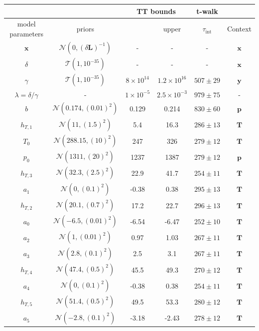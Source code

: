 \begin{table}
	\centering
	\begin{tabular}{ |c||c|c|c|c|c|   }
		\hline
		& &\multicolumn{2}{|c|}{TT bounds}& t-walk&\\
		\hline
		model parameters& priors&\makecell{lower}& \makecell{upper\\
		}&$\tau_{\text{int}}$&Context\\
		\hhline{|=||=|=|=|=|=|}
		$\bm{x}$ &$\mathcal{N}(0,(\delta \bm{L})^{-1})$ & -&-&-& $\bm{x}$\\ \hline
		$\delta$ &$\mathcal{T}(1,10^{-35})$ & -&-&  -& $\bm{x}$\\ \hline
		$\gamma$ & $\mathcal{T}(1,10^{-35})$ &$8\times10^{14}$ &$1.2\times10^{16}$&  $ 507\pm 29$ &$\bm{y}$\\ \hline
		$\lambda  = \delta / \gamma$ &- & $1\times10^{-5}$&$2.5\times10^{-3}$& $979 \pm 75$ & -\\ \hline
		$b$ &  $\mathcal{N}(0.174,(0.01)^2)$& 0.129& 0.214 &$830\pm 60$&$\bm{p}$\\ \hline
		$h_{T,1}$ &  $\mathcal{N}(11,(1.5)^2)$&5.4 &16.3&$286\pm 13$ &$\bm{T}$\\ \hline
		$T_{0}$ &  $\mathcal{N}(288.15,(10)^2)$& 247 &326&$279 \pm 12$&$\bm{T}$\\ \hline
		$p_0$ &  $\mathcal{N}(1311,(20)^2)$&1237 &1387&$279\pm 12$&$\bm{p}$\\ \hline
		$h_{T,3}$ &  $\mathcal{N}(32.3,(2.5)^2)$&22.9&41.7&$254\pm 11$&$\bm{T}$\\ \hline
		$a_{1}$ &  $\mathcal{N}(0,(0.1)^2)$&-0.38 &0.38&$295 \pm 13$&$\bm{T}$\\ \hline
		$h_{T,2}$ &  $\mathcal{N}(20.1,(0.7)^2)$&17.2 &22.7&$296\pm 13$&$\bm{T}$\\ \hline
		$a_{0}$ &  $\mathcal{N}(-6.5,(0.01)^2)$&-6.54 &-6.47&$252 \pm 10$&$\bm{T}$\\ \hline
		$a_{2}$ &  $\mathcal{N}(1,(0.01)^2)$&0.97 &1.03&$267 \pm 11$&$\bm{T}$\\ \hline
		$a_{3}$ &  $\mathcal{N}(2.8,(0.1)^2)$&2.5 &3.1&$267\pm 11$&$\bm{T}$\\ \hline
		$h_{T,4}$ &  $\mathcal{N}(47.4,(0.5)^2)$&45.5 &49.3&$270 \pm 12$&$\bm{T}$\\ \hline
		$a_{4}$ &  $\mathcal{N}(0,(0.1)^2)$&-0.38 &0.38&$254 \pm 11$&$\bm{T}$\\ \hline
		$h_{T,5}$ &  $\mathcal{N}(51.4,(0.5)^2)$&49.5 &53.3&$280 \pm 12$&$\bm{T}$\\ \hline
		$a_{5}$ &  $\mathcal{N}(-2.8,(0.1)^2)$&-3.18 &-2.43&$278 \pm 12$&$\bm{T}$\\ \hline

\end{tabular}
\end{table}
